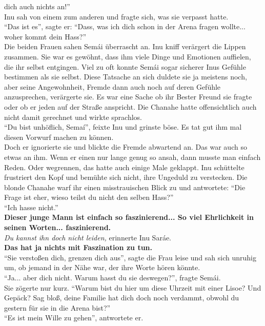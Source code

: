 dich auch nichts an!''\\
Inu sah von einem zum anderen und fragte sich, was sie verpasst hatte.\\
``Das ist es'', sagte er: ``Dass, was ich dich schon in der Arena fragen wollte... woher kommt dein 
Hass?''\\
Die beiden Frauen sahen Semái überrascht an. Inu kniff verärgert die Lippen zusammen. Sie war es 
gewöhnt, dass ihm viele Dinge und Emotionen auffielen, die ihr selbst entgingen. Viel zu oft konnte 
Semái sogar sicherer Inus Gefühle bestimmen als sie selbst. Diese Tatsache an sich duldete sie ja 
meistens noch, aber seine Angewohnheit, Fremde dann auch noch auf deren Gefühle anzusprechen, 
verärgerte sie. Es war eine Sache ob ihr Bester Freund sie fragte oder ob er jeden auf der Straße 
anspricht. Die Chanahe hatte offensichtlich auch nicht damit gerechnet und wirkte sprachlos.\\
``Du bist unhöflich, Semaí'', feixte Inu und grinste böse. Es tat gut ihm mal diesen Vorwurf 
machen zu können.\\
Doch er ignorierte sie und blickte die Fremde abwartend an. Das war auch so etwas an ihm. Wenn er 
einen nur lange genug so ansah, dann musste man einfach Reden. Oder wegrennen, das hatte auch 
einige Male geklappt. Inu schüttelte frustriert den Kopf und bemühte sich nicht, ihre Ungeduld zu 
verstecken. Die blonde Chanahe warf ihr einen misstrauischen Blick zu und antwortete: ``Die Frage 
ist eher, wieso teilst du nicht den selben Hass?''\\
``Ich hasse nicht.''\\
\textbf{Dieser junge Mann ist einfach so faszinierend... So viel Ehrlichkeit in seinen Worten... 
faszinierend.}\\
\textit{Du kannst ihn doch nicht leiden,} erinnerte Inu Saráe.\\
\textbf{Das hat ja nichts mit Faszination zu tun.}\\
``Sie verstoßen dich, grenzen dich aus'', sagte die Frau leise und sah sich unruhig um, ob jemand 
in der Nähe war, der ihre Worte hören könnte.\\
``Ja... aber dich nicht. Warum hasst du sie deswegen?'', fragte Semái.\\
Sie zögerte nur kurz. ``Warum bist du hier um diese Uhrzeit mit einer Lisoe? Und Gepäck? Sag bloß, 
deine Familie hat dich doch noch verdammt, obwohl du gestern für sie in die Arena bist?''\\
``Es ist mein Wille zu gehen'', antwortete er.\\
